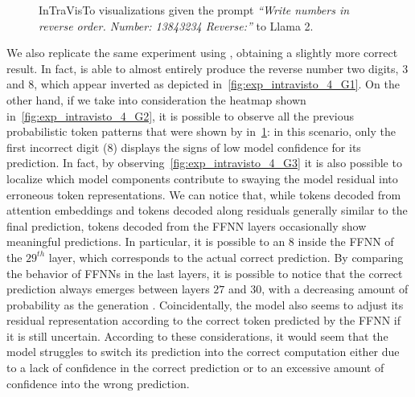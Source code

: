 \begin{figure}[t!]
    \centering
    \quad
    \caption{InTraVisTo visualizations given the prompt \emph{``Write numbers in reverse order. Number: 13843234 Reverse:''} to Llama 2.}
    \label{fig:exp_intravisto_4_F}
\end{figure}

We also replicate the same experiment using , obtaining a slightly more correct result.
In fact,  is able to almost entirely produce the reverse number  two digits, $3$ and $8$, which appear inverted as depicted in~\cref{fig:exp_intravisto_4_G1}.
On the other hand, if we take into consideration the heatmap shown in~\cref{fig:exp_intravisto_4_G2}, it is possible to observe all the previous probabilistic token patterns that were shown by  in~\cref{fig:exp_intravisto_4_F}: in this scenario, only the first incorrect digit ($8$) displays the signs of low model confidence for its prediction.
In fact, by observing~\cref{fig:exp_intravisto_4_G3} it is also possible to localize which model components contribute to swaying the model residual into erroneous token representations.
We can notice that, while tokens decoded from attention embeddings  and tokens decoded along residuals  generally similar to the final prediction, tokens decoded from the FFNN layers occasionally show meaningful predictions.
In particular, it is possible to  an $8$ inside the FFNN of the $29^{th}$ layer, which corresponds to the actual correct prediction.
By comparing the behavior of FFNNs in the last layers, it is possible to notice that the correct prediction always emerges between layers $27$ and $30$, with a decreasing amount of probability as the generation .
Coincidentally, the model also seems to adjust its residual representation according to the correct token predicted by the FFNN if it is still uncertain.
According to these considerations, it would seem that the model struggles to switch its prediction into the correct computation either due to a lack of confidence in the correct prediction or to an excessive amount of confidence into the wrong prediction.

